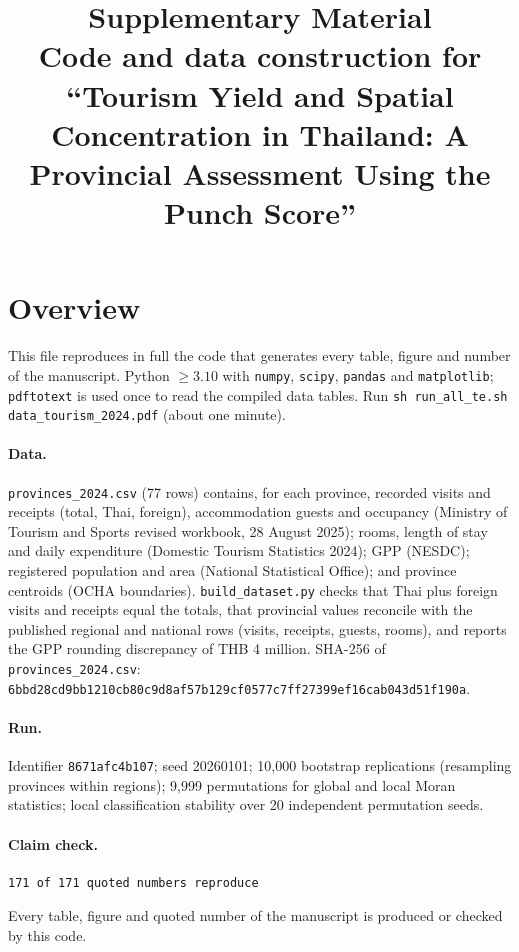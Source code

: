 \documentclass[10pt,a4paper]{article}
\title{Supplementary Material\\ \large Code and data construction for ``Tourism Yield and Spatial Concentration in Thailand: A Provincial Assessment Using the Punch Score''}
\date{}
\begin{document}
\maketitle
\section{Overview}
This file reproduces in full the code that generates every table, figure and number of the manuscript. Python $\ge3.10$ with \texttt{numpy}, \texttt{scipy}, \texttt{pandas} and \texttt{matplotlib}; \texttt{pdftotext} is used once to read the compiled data tables. Run \texttt{sh run\_all\_te.sh data\_tourism\_2024.pdf} (about one minute).

\paragraph{Data.} \texttt{provinces\_2024.csv} (77 rows) contains, for each province, recorded visits and receipts (total, Thai, foreign), accommodation guests and occupancy (Ministry of Tourism and Sports revised workbook, 28 August 2025); rooms, length of stay and daily expenditure (Domestic Tourism Statistics 2024); GPP (NESDC); registered population and area (National Statistical Office); and province centroids (OCHA boundaries). \texttt{build\_dataset.py} checks that Thai plus foreign visits and receipts equal the totals, that provincial values reconcile with the published regional and national rows (visits, receipts, guests, rooms), and reports the GPP rounding discrepancy of THB 4 million. SHA-256 of \texttt{provinces\_2024.csv}: \texttt{6bbd28cd9bb1210cb80c9d8af57b129cf0577c7ff27399ef16cab043d51f190a}.

\paragraph{Run.} Identifier \texttt{8671afc4b107}; seed 20260101; 10{,}000 bootstrap replications (resampling provinces within regions); 9{,}999 permutations for global and local Moran statistics; local classification stability over 20 independent permutation seeds.

\paragraph{Claim check.}
\begin{lstlisting}[numbers=none]
171 of 171 quoted numbers reproduce
\end{lstlisting}
Every table, figure and quoted number of the manuscript is produced or checked by this code.
\end{document}
